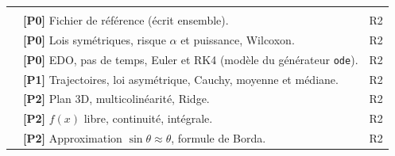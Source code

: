 \documentclass[11pt,a4paper]{article}
\begin{document}
\begin{appendices}
\begin{longtable}{@{}L{6.4cm} >{\raggedright\arraybackslash}p{\dimexpr\textwidth-7.9cm-4\tabcolsep\relax} L{1.5cm}@{}}
   \\
   & \textbf{[P0]} Fichier de référence (écrit ensemble). & R2 \\
   & \textbf{[P0]} Lois symétriques, risque $\alpha$ et puissance, Wilcoxon. & R2 \\
   & \textbf{[P0]} EDO, pas de temps, Euler et RK4 (modèle du générateur \texttt{ode}). & R2 \\
   & \textbf{[P1]} Trajectoires, loi asymétrique, Cauchy, moyenne et médiane. & R2 \\
   & \textbf{[P2]} Plan 3D, multicolinéarité, Ridge. & R2 \\
   & \textbf{[P2]} $f(x)$ libre, continuité, intégrale. & R2 \\
   & \textbf{[P2]} Approximation $\sin\theta \approx \theta$, formule de Borda. & R2 \\


\end{longtable}
\end{appendices}
\end{document}
